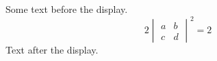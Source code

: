 \documentclass[12pt]{article}
\begin{document}
Some text before the display.
\[ 2 \begin{vmatrix} a & b \\ c & d \end{vmatrix}^{2} = 2 \]
Text after the display.
\end{document}
